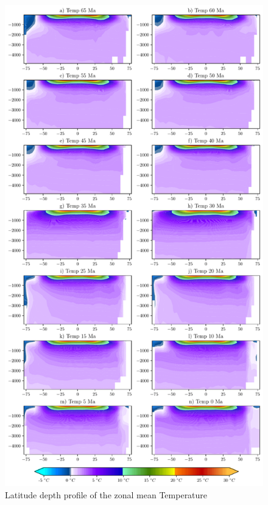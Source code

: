 \documentclass[a4paper]{article}
\begin{document}
\begin{figure}[ht]
	\centering
	\includegraphics[width=0.7\linewidth]{full_sst_depth.pdf}
	\caption{Latitude depth profile of the zonal mean Temperature}
	\label{fig:sst_zmean_total}
\end{figure}
\end{document}

